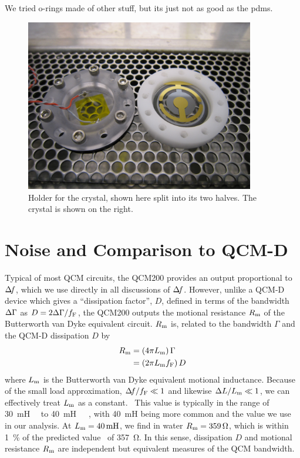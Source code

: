 We tried o-rings made of other stuff, but its just not as good as the pdms.

\begin{figure}[ht]
\centering
\includegraphics[width=10cm,keepaspectratio]{qcm/figures/qcm_holderdiss.jpg}
\caption{Holder for the crystal, shown here split into its two halves.  The
crystal is shown on the right.}
\label{fig:cfqcmexpsetup}
\end{figure}

\section{Noise and Comparison to QCM-D} \label{sec:suppqcmdcomp}
Typical of most QCM circuits, the QCM200 provides an output proportional to
$\Delta\!f$, which we use directly in all discussions of $\Delta\!f$.  However, unlike
a QCM-D device which gives a ``dissipation factor'', $D$, defined in
terms of the bandwidth $\Delta\Gamma$ as $D=2\Delta\Gamma/f_\mathrm{F}$, the QCM200
outputs the motional resistance $R_\mathrm{m}$ of the Butterworth van Dyke
equivalent circuit.  $R_\mathrm{m}$ is, related to
the bandwidth $\Gamma$ and the QCM-D dissipation $D$ by 
\begin{align}
 R_\mathrm{m}&=\left(4 \pi L_\mathrm{m}\right) \Gamma\\
 &=\left(2 \pi L_\mathrm{m} f_\mathrm{F}\right) D
\end{align}
where $L_\mathrm{m}$ is the Butterworth van Dyke equivalent motional inductance.
Because of the small load approximation, $\Delta\!f/f_\mathrm{F} \ll 1$ and
likewise $\Delta L/L_\mathrm{m} \ll 1$, we can effectively treat $L_\mathrm{m}$ as a
constant.~\cite{geelhood2002transient}
This value is
typically in the range of
\SI{30}{\milli\henry}~\cite{srsqcm200manual}~\cite{hussain2005ots} to
\SI{40}{\milli\henry}~\cite{gottschling2000detection}~\cite{arnau2002circuit}~\cite{snellings2001response},
with \SI{40}{\milli\henry} being more common and the value we use in our
analysis.  At $\Lm=\SI{40}{\milli\henry}$, we find in water
$R_\mathrm{m}=\SI{359}{\ohm}$, which is within \SI{1}{\percent} of the predicted
value~\cite{kanazawa1985frequency} of \SI{357}{\ohm}.  In this sense,
dissipation $D$ and motional resistance $R_\mathrm{m}$ are independent but
equivalent measures of the QCM bandwidth.

